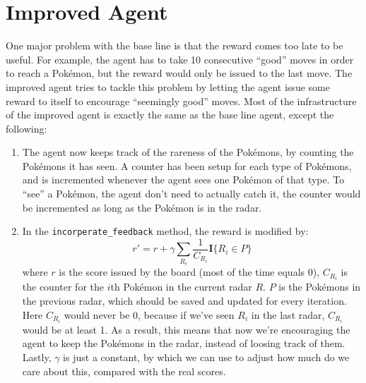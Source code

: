 \documentclass[12pt]{article}
\begin{document}
\section*{Improved Agent}
One major problem with the base line is that the reward comes too late to be 
useful. For example, the agent has to take 10 consecutive ``good'' moves 
in order to reach a Pok\'emon, but the reward would only be issued to the 
last move. The improved agent
tries to tackle this problem by letting the
agent issue some reward to itself to encourage ``seemingly good'' moves.
Most of the infrastructure 
of the improved agent is exactly the same as the base line agent, except the
following:
\begin{enumerate}[label=(\alph*)]
\item
The agent now keeps track of the rareness of the Pok\'emons, by counting 
the Pok\'emons it has seen. A counter has been setup for each type of 
Pok\'emons, and is incremented whenever the agent sees one Pok\'emon 
of that type. To ``see'' a Pok\'emon, the agent don't need to actually
catch it, the counter would be incremented as long as the Pok\'emon
is in the radar. 
\item In the \texttt{incorperate\_feedback} method, the reward is modified by:
\[
	r' = r + \gamma \sum_{R_i} \frac{1}{C_{R_i}} \mathbf{I}\{R_i \in P\}
\]
where $r$ is the score issued by the board (most of the time equals 0), 
$C_{R_i}$ is the counter for the $i$th Pok\'emon in the current radar $R$.
$P$ is the Pok\'emons in the previous radar, which should be saved and
updated for every iteration. Here $C_{R_i}$ would never be 0, because if 
we've seen $R_i$ in the last radar, $C_{R_i}$ would be at least 1.
As a result, this means that now we're encouraging the agent to 
keep the Pok\'emons in the radar, instead of loosing track of them.
Lastly, $\gamma$ is just a constant, by which we can use to adjust how
much do we care about this, compared with the real scores.
\end{enumerate}
\end{document}
